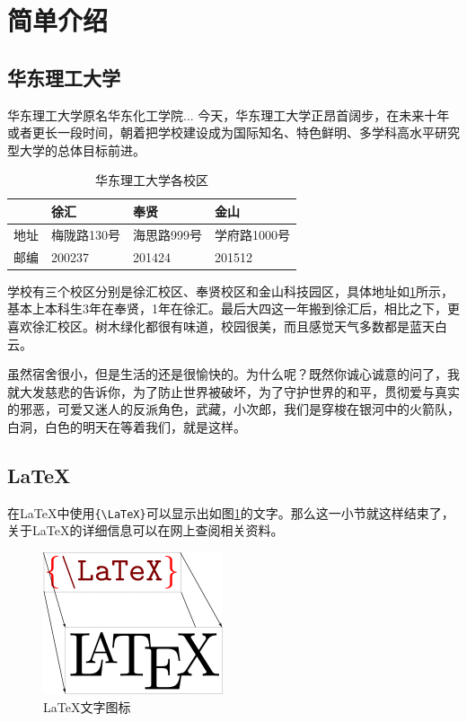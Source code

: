 \documentclass{ecustbachelorthesis}
\begin{document}
\docinit
{}
\setlength{\baselineskip}{18pt}

\begin{abstractzh}
\makeatletter\me@abstractzh\makeatother
\end{abstractzh}

\begin{abstracten}
\makeatletter\me@abstracten\makeatother
\end{abstracten}

\mktableofcontents
\clearpage
{}

\section{简单介绍}
\subsection{华东理工大学}
华东理工大学原名华东化工学院... 今天，华东理工大学正昂首阔步，在未来十年或者更长一段时间，朝着把学校建设成为国际知名、特色鲜明、多学科高水平研究型大学的总体目标前进\cite{ecust}。
\begin{table}[!htbp]
  \centering
  \caption{华东理工大学各校区}
  \label{tab:ecust}
  \begin{tabular}{|l|l|l|l|}\hline
        & 徐汇        & 奉贤       & 金山\\ \hline
    地址 & 梅陇路130号 & 海思路999号 & 学府路1000号\\ \hline
    邮编 & 200237     & 201424    & 201512\\
    \hline
  \end{tabular}
\end{table}

学校有三个校区分别是徐汇校区、奉贤校区和金山科技园区，具体地址如\ref{tab:ecust}所示，基本上本科生3年在奉贤，1年在徐汇。最后大四这一年搬到徐汇后，相比之下，更喜欢徐汇校区。树木绿化都很有味道，校园很美，而且感觉天气多数都是蓝天白云。

虽然宿舍很小，但是生活的还是很愉快的。为什么呢？既然你诚心诚意的问了，我就大发慈悲的告诉你，为了防止世界被破坏，为了守护世界的和平，贯彻爱与真实的邪恶，可爱又迷人的反派角色，武藏，小次郎，我们是穿梭在银河中的火箭队，白洞，白色的明天在等着我们，就是这样\cite{pokemon}。
\subsection{LaTeX}
在LaTeX中使用\verb${\LaTeX}$可以显示出如图\ref{fig:latex}的文字\cite{latex}。那么这一小节就这样结束了，关于LaTeX的详细信息可以在网上查阅相关资料。
\begin{figure}[!htbp]
  \centering
  \includegraphics[width=150pt]{latex}
  \caption{LaTeX文字图标}
  \label{fig:latex}
\end{figure}
\end{document}
